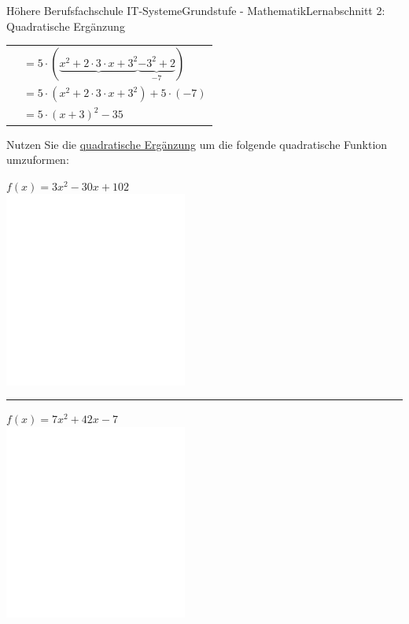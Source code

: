 \documentclass[11pt,twocolumn,oneside,openany,headings=optiontotoc,11pt,numbers=noenddot]{article}
\begin{document}
\begin{worksheet}{Höhere Berufsfachschule IT-Systeme}{Grundstufe - Mathematik}{Lernabschnitt 2: Quadratische Ergänzung}
\begin{tabularx}{0.48\textwidth}{lX}
			& \(= 5\cdot(\underbrace{x^2 + 2\cdot{}3\cdot{}x + 3^2} \underbrace{-3^2 + 2}_{-7})\)\\
			& \(= 5\cdot(x^2 + 2\cdot{}3\cdot{}x + 3^2) + 5\cdot(-7)\)\\
			& \(= 5\cdot(x+3)^2 -35\)
		\end{tabularx}
		\newpage
		Nutzen Sie die \underline{quadratische Ergänzung} um die folgende quadratische Funktion umzuformen:\\
		\par\noindent
		\(f(x) = 3x^2 - 30x +102\)\\
		\includegraphics[width=0.45\textwidth]{../../empty.jpg}\\
		\rule{0.48\textwidth}{0.1pt}
		\par\noindent
		\(f(x) = 7x^2 + 42x - 7\)\\
		\includegraphics[width=0.45\textwidth]{../../empty.jpg}\\
	\end{worksheet}
\end{document}
